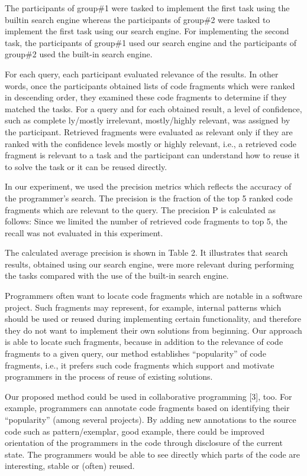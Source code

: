 \documentclass{llncs}
\begin{document}
The participants of group\#1 were tasked to implement the first task using the builtin
search engine whereas the participants of group\#2 were tasked to implement the
first task using our search engine. For implementing the second task, the participants
of group\#1 used our search engine and the participants of group\#2 used the built-in
search engine.

For each query, each participant evaluated relevance of the results. In other words,
once the participants obtained lists of code fragments which were ranked in descending
order, they examined these code fragments to determine if they matched the tasks.
For a query and for each obtained result, a level of confidence, such as complete
ly/mostly irrelevant, mostly/highly relevant, was assigned by the participant. Retrieved
fragments were evaluated as relevant only if they are ranked with the confidence
levels mostly or highly relevant, i.e., a retrieved code fragment is relevant to a
task and the participant can understand how to reuse it to solve the task or it can be
reused directly.

In our experiment, we used the precision metrics which reflects the accuracy of the
programmer’s search. The precision is the fraction of the top 5 ranked code fragments
which are relevant to the query. The precision P is calculated as follows:
Since we limited the number of retrieved code fragments to top 5, the recall was not
evaluated in this experiment.

The calculated average precision is shown in Table 2. It illustrates that search results,
obtained using our search engine, were more relevant during performing the
tasks compared with the use of the built-in search engine.

Programmers often want to locate code fragments which are notable in a software
project. Such fragments may represent, for example, internal patterns which should be
used or reused during implementing certain functionality, and therefore they do not
want to implement their own solutions from beginning. Our approach is able to locate
such fragments, because in addition to the relevance of code fragments to a given
query, our method establishes “popularity” of code fragments, i.e., it prefers such
code fragments which support and motivate programmers in the process of reuse of
existing solutions.

Our proposed method could be used in collaborative programming [3], too. For example,
programmers can annotate code fragments based on identifying their “popularity”
(among several projects). By adding new annotations to the source code such as
pattern/exemplar, good example, there could be improved orientation of the programmers
in the code through disclosure of the current state. The programmers would
be able to see directly which parts of the code are interesting, stable or (often) reused.
\end{document}
